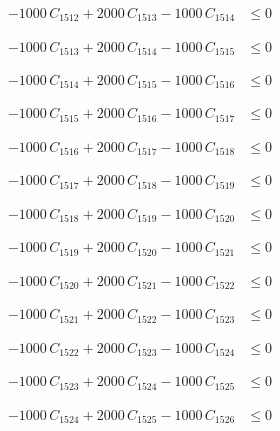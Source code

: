\documentclass[a4paper,11pt]{article}
\begin{document}
\begin{align}
-1000\,C_{1512} + 2000\,C_{1513} - 1000\,C_{1514} &\leq 0 \nonumber
\end{align}

\begin{align}
-1000\,C_{1513} + 2000\,C_{1514} - 1000\,C_{1515} &\leq 0 \nonumber
\end{align}

\begin{align}
-1000\,C_{1514} + 2000\,C_{1515} - 1000\,C_{1516} &\leq 0 \nonumber
\end{align}

\begin{align}
-1000\,C_{1515} + 2000\,C_{1516} - 1000\,C_{1517} &\leq 0 \nonumber
\end{align}

\begin{align}
-1000\,C_{1516} + 2000\,C_{1517} - 1000\,C_{1518} &\leq 0 \nonumber
\end{align}

\begin{align}
-1000\,C_{1517} + 2000\,C_{1518} - 1000\,C_{1519} &\leq 0 \nonumber
\end{align}

\begin{align}
-1000\,C_{1518} + 2000\,C_{1519} - 1000\,C_{1520} &\leq 0 \nonumber
\end{align}

\begin{align}
-1000\,C_{1519} + 2000\,C_{1520} - 1000\,C_{1521} &\leq 0 \nonumber
\end{align}

\begin{align}
-1000\,C_{1520} + 2000\,C_{1521} - 1000\,C_{1522} &\leq 0 \nonumber
\end{align}

\begin{align}
-1000\,C_{1521} + 2000\,C_{1522} - 1000\,C_{1523} &\leq 0 \nonumber
\end{align}

\begin{align}
-1000\,C_{1522} + 2000\,C_{1523} - 1000\,C_{1524} &\leq 0 \nonumber
\end{align}

\begin{align}
-1000\,C_{1523} + 2000\,C_{1524} - 1000\,C_{1525} &\leq 0 \nonumber
\end{align}

\begin{align}
-1000\,C_{1524} + 2000\,C_{1525} - 1000\,C_{1526} &\leq 0 \nonumber
\end{align}
\end{document}
